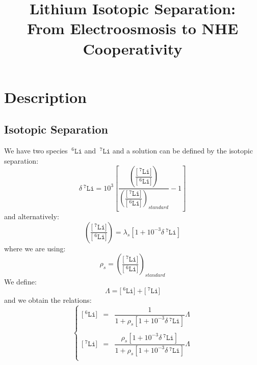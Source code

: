 \documentclass[aps,onecolumn,11pt]{revtex4}
\newcommand{\mychem}[1]{\mathtt{#1}}
\newcommand{\myconc}[1]{\big[#1\big]}
\newcommand{\spLi}[1]{{\!~^{#1}\mychem{Li}}}
\newcommand{\Li}[1]{\myconc{\spLi{#1}}}
\newcommand{\deltaLi}{\delta\!\!\spLi{7}}
\newcommand{\LiAll}{\Lambda}
\begin{document}
\title{Lithium Isotopic Separation:\\ From Electroosmosis to NHE Cooperativity}
\maketitle

\section{Description}
\subsection{Isotopic Separation}
We have two species $\spLi{6}$ and $\spLi{7}$ and a solution can be defined by the isotopic 
separation:
\begin{equation}
	\deltaLi = 10^3 \left[ 
	\dfrac{
	\left(\dfrac{\Li{7}}{\Li{6}}\right)
	}
	{
	\left(\dfrac{\Li{7}}{\Li{6}}\right)_{standard}
	}
	- 1 \right]
\end{equation}
and alternatively:
\begin{equation}
	\left(\dfrac{\Li{7}}{\Li{6}}\right) = \lambda_s \left[ 1+10^{-3} \deltaLi \right]
\end{equation}
where we are using:
\begin{equation}
	\rho_s = \left(\dfrac{\Li{7}}{\Li{6}}\right)_{standard} %
\end{equation}
We define:
\begin{equation}
	\LiAll = \Li{6}+\Li{7}
\end{equation}
and we obtain the relations:
\begin{equation}
\left\lbrace
\begin{array}{rcl}
\Li{6} & = & \dfrac{1}{1+\rho_s[1+10^{-3}\deltaLi]} \LiAll \\
\\
\Li{7} & = &  \dfrac{\rho_s[1+10^{-3}\deltaLi]}{1+\rho_s[1+10^{-3}\deltaLi]}\LiAll\\
\end{array}
\right.
\end{equation}
\end{document}
